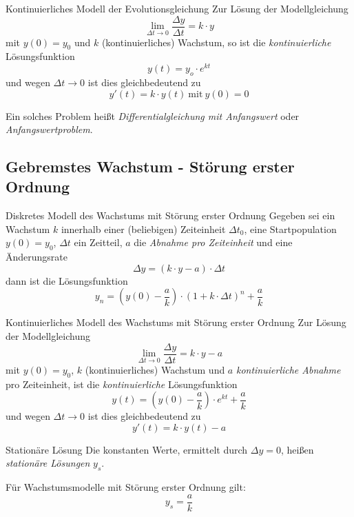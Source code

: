 \documentclass[german]{../spicker}
\begin{document}
\begin{defi}{Kontinuierliches Modell der Evolutionsgleichung}
    Zur Lösung der Modellgleichung
    $$
        \lim_{\Delta t \to 0} \frac{\Delta y}{\Delta t} = k\cdot y
    $$
    mit $y(0) = y_0$ und $k$ (kontinuierliches) Wachstum, so ist die \emph{kontinuierliche} Lösungsfunktion
    $$
        \boxed{y(t) = y_o \cdot e^{kt}}
    $$
    und wegen $\Delta t \to 0$ ist dies gleichbedeutend zu
    $$
        y'(t) = k \cdot y(t) \ \text{mit} \ y(0) = 0
    $$

    Ein solches Problem heißt \emph{Differentialgleichung mit Anfangswert} oder \emph{Anfangswertproblem}.
\end{defi}

\subsection{Gebremstes Wachstum - Störung erster Ordnung}

\begin{defi}{Diskretes Modell des Wachstums mit Störung erster Ordnung}
    Gegeben sei ein Wachstum $k$ innerhalb einer (beliebigen) Zeiteinheit $\Delta t_0$, eine Startpopulation $y(0) = y_0$, $\Delta t$ ein Zeitteil, $a$ die \emph{Abnahme pro Zeiteinheit} und eine Änderungsrate
    $$
        \Delta y = (k\cdot y - a) \cdot \Delta t
    $$
    dann ist die Lösungsfunktion
    $$
        \boxed{y_n = \left( y(0) - \frac{a}{k} \right) \cdot \left( 1 + k \cdot \Delta t \right)^n + \frac{a}{k}}
    $$
\end{defi}

\begin{defi}{Kontinuierliches Modell des Wachstums mit Störung erster Ordnung}
    Zur Lösung der Modellgleichung
    $$
        \lim_{\Delta t \to 0} \frac{\Delta y}{\Delta t} = k\cdot y - a
    $$
    mit $y(0) = y_0$, $k$ (kontinuierliches) Wachstum und $a$ \emph{kontinuierliche Abnahme} pro Zeiteinheit, ist die \emph{kontinuierliche} Lösungsfunktion
    $$
        \boxed{y(t) = \left( y(0) - \frac{a}{k} \right) \cdot e^{kt} + \frac{a}{k}}
    $$
    und wegen $\Delta t \to 0$ ist dies gleichbedeutend zu
    $$
        y'(t) = k \cdot y(t) - a
    $$
\end{defi}

\begin{defi}{Stationäre Lösung}
    Die konstanten Werte, ermittelt durch $\Delta y = 0$, heißen \emph{stationäre Lösungen} $y_s$.

    Für Wachstumsmodelle mit Störung erster Ordnung gilt:
    $$
        y_s = \frac{a}{k}
    $$
\end{defi}
\end{document}
